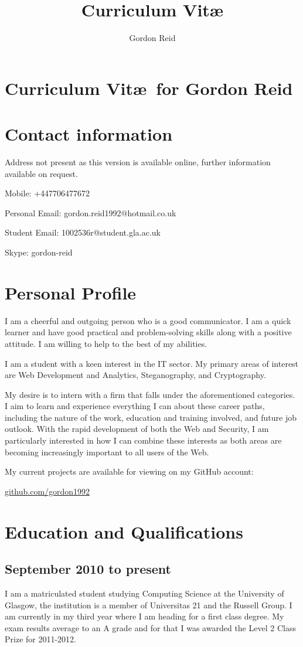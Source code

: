 \documentclass[11pt,a4paper]{article}
\title{Curriculum Vit\ae}
\author{Gordon Reid}
\begin{document}
\section*{Curriculum Vit\ae\ for Gordon Reid}
\section*{Contact information}
Address not present as this version is available online, further information 
available on request.

Mobile: +447706477672

Personal Email: gordon.reid1992@hotmail.co.uk

Student Email: 1002536r@student.gla.ac.uk

Skype: gordon-reid
\section*{Personal Profile}
I am a cheerful and outgoing person who is a good communicator. I am a quick 
learner and have good practical and problem-solving skills along with a 
positive attitude. I am willing to help to the best of my abilities.

I am a student with a keen interest in the IT sector. My primary areas of
interest are Web Development and Analytics, Steganography, and Cryptography.

My desire is to intern with a firm that falls under the aforementioned
categories. I aim to learn and experience everything I can about these
career paths, including the nature of the work, education and training
involved, and future job outlook. With the rapid development of both the Web
and Security, I am particularly interested in how I can combine these
interests as both areas are becoming increasingly important to all users of
the Web.

My current projects are available for viewing on my GitHub account:

\url{github.com/gordon1992}
\section*{Education and Qualifications}
\subsection*{September 2010 to present}
I am a matriculated student studying Computing Science at the University of 
Glasgow, the institution is a member of Universitas 21 and the Russell Group.
I am currently in my third year where I am heading for a first class degree. 
My exam results average to an A grade and for that I was awarded the Level 2
Class Prize for 2011-2012.
\end{document}

